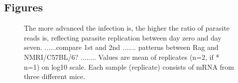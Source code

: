 \documentclass{bmcart}
\begin{document}
\begin{backmatter}


\section*{Figures}
\begin{figure}[h!]
  \caption{
  The more advanced the infection is, the higher the ratio of parasite reads is, reflecting parasite replication between day zero and day seven. ......compare 1st and 2nd ....... patterns between Rag and NMRI/C57BL/6?  ........ Values are mean of replicates (n=2, if * n=1) on log10 scale. Each sample (replicate) consists of mRNA from three different mice.}
  \end{figure}





\end{backmatter}
\end{document}
